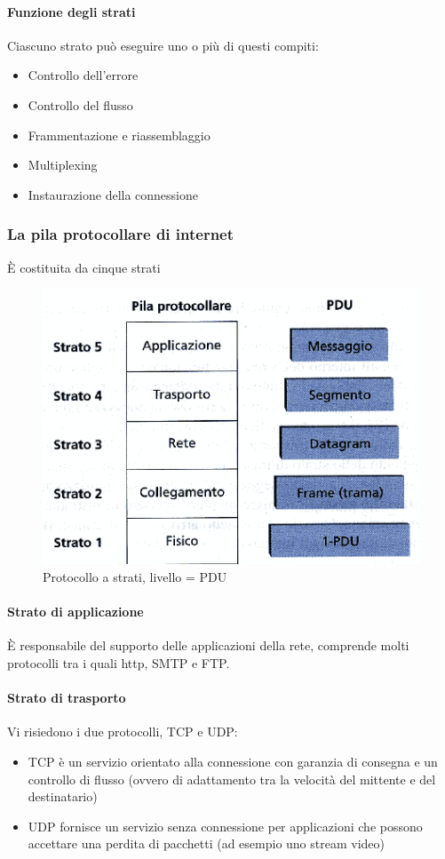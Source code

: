 \documentclass[11pt,a4paper]{article}
\begin{document}
\paragraph{Funzione degli strati}
Ciascuno strato può eseguire uno o più di questi compiti:
\begin{itemize}
	\item Controllo dell’errore
	\item Controllo del flusso
	\item Frammentazione e riassemblaggio
	\item Multiplexing
	\item Instaurazione della connessione
\end{itemize}
\subsubsection{La pila protocollare di internet}
È costituita da cinque strati

\begin{figure}
	\includegraphics[scale=0.6]{img/008.png}
	\caption{Protocollo a strati, livello = PDU} 
\end{figure}

\paragraph{Strato di applicazione}
È responsabile del supporto delle applicazioni della rete, comprende molti protocolli tra i quali http, SMTP e FTP.
\paragraph{Strato di trasporto}
Vi risiedono i due protocolli, TCP e UDP:
\begin{itemize}
	\item TCP è un servizio orientato alla connessione con garanzia di consegna e un controllo di flusso (ovvero di adattamento tra la velocità del mittente e del destinatario)
	\item UDP fornisce un servizio senza connessione per applicazioni che possono accettare una perdita di pacchetti (ad esempio uno stream video)
\end{itemize}
\end{document}
